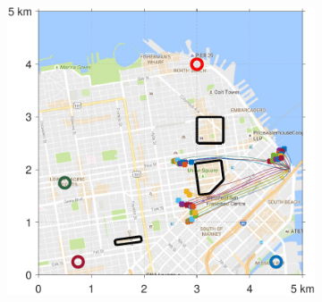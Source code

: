 \begin{figure}[!htb]
\begin{subfigure}{0.5\textwidth}
  \includegraphics[width=\columnwidth]{figs/sf_d6sep0_s2}
  \subcaption{}
  \label{fig:sf_d6sep0_s2}
\end{subfigure}%


\end{figure}
